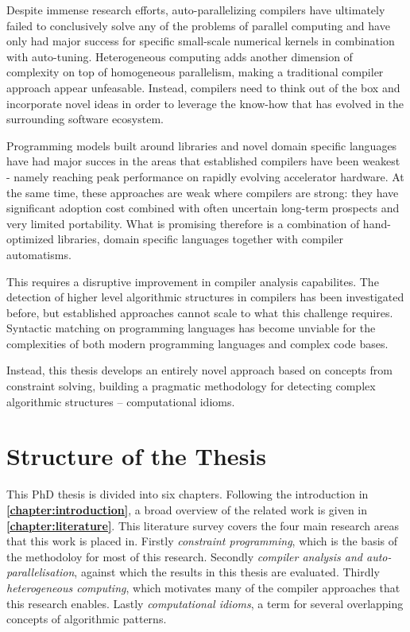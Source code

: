     Despite immense research efforts, auto-parallelizing compilers have
    ultimately failed to conclusively solve any of the problems of parallel
    computing and have only had major success for specific small-scale numerical
    kernels in combination with auto-tuning.
    Heterogeneous computing adds another dimension of complexity on top of
    homogeneous parallelism, making a traditional compiler approach appear
    unfeasable.
    Instead, compilers need to think out of the box and incorporate novel ideas
    in order to leverage the know-how that has evolved in the surrounding
    software ecosystem.

    Programming models built around libraries and novel domain specific
    languages have had major succes in the areas that established compilers have
    been weakest - namely reaching peak performance on rapidly evolving
    accelerator hardware.
    At the same time, these approaches are weak where compilers are strong:
    they have significant adoption cost combined with often uncertain long-term
    prospects and very limited portability.
    What is promising therefore is a combination of hand-optimized libraries,
    domain specific languages together with compiler automatisms.

    This requires a disruptive improvement in compiler analysis capabilites.
    The detection of higher level algorithmic structures in compilers has been
    investigated before, but established approaches cannot scale to what
    this challenge requires.
    Syntactic matching on programming languages has become
    unviable for the complexities of both modern programming languages and
    complex code bases.

    Instead, this thesis develops an entirely novel approach based on concepts
    from constraint solving, building a pragmatic methodology for detecting
    complex algorithmic structures -- computational idioms.

\pagebreak
\section{Structure of the Thesis}

    This PhD thesis is divided into six chapters.
    Following the introduction in {\bf\cref{chapter:introduction}}, a broad
    overview of the related work is given in {\bf\cref{chapter:literature}}.
    This literature survey covers the four main research areas that this work
    is placed in.
    Firstly {\em constraint programming}, which is the basis of the methodoloy
    for most of this research.
    Secondly {\em compiler analysis and auto-parallelisation}, against which the
    results in this thesis are evaluated.
    Thirdly {\em heterogeneous computing}, which motivates many of the compiler
    approaches that this research enables.
    Lastly {\em computational idioms}, a term for several overlapping concepts
    of algorithmic patterns.

